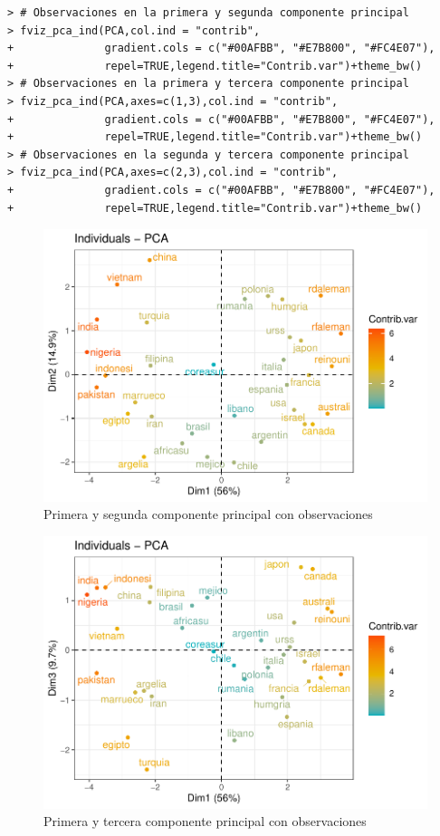 \documentclass[12pt,twoside]{report}
\begin{document}
\begin{lstlisting}
> # Observaciones en la primera y segunda componente principal
> fviz_pca_ind(PCA,col.ind = "contrib",
+              gradient.cols = c("#00AFBB", "#E7B800", "#FC4E07"),
+              repel=TRUE,legend.title="Contrib.var")+theme_bw()
> # Observaciones en la primera y tercera componente principal
> fviz_pca_ind(PCA,axes=c(1,3),col.ind = "contrib",
+              gradient.cols = c("#00AFBB", "#E7B800", "#FC4E07"),
+              repel=TRUE,legend.title="Contrib.var")+theme_bw()
> # Observaciones en la segunda y tercera componente principal
> fviz_pca_ind(PCA,axes=c(2,3),col.ind = "contrib",
+              gradient.cols = c("#00AFBB", "#E7B800", "#FC4E07"),
+              repel=TRUE,legend.title="Contrib.var")+theme_bw()
\end{lstlisting}

\begin{figure}[H]
\includegraphics[width=\textwidth]{../code/figures/primera_segunda_obs.pdf}
\caption{Primera y segunda componente principal con observaciones}
\label{fig:primera_segunda_obs}
\end{figure} 

\begin{figure}[H]
\includegraphics[width=\textwidth]{../code/figures/primera_tercera_obs.pdf}
\caption{Primera y tercera componente principal con observaciones}
\label{fig:primera_tercera_obs}
\end{figure} 
\end{document}
